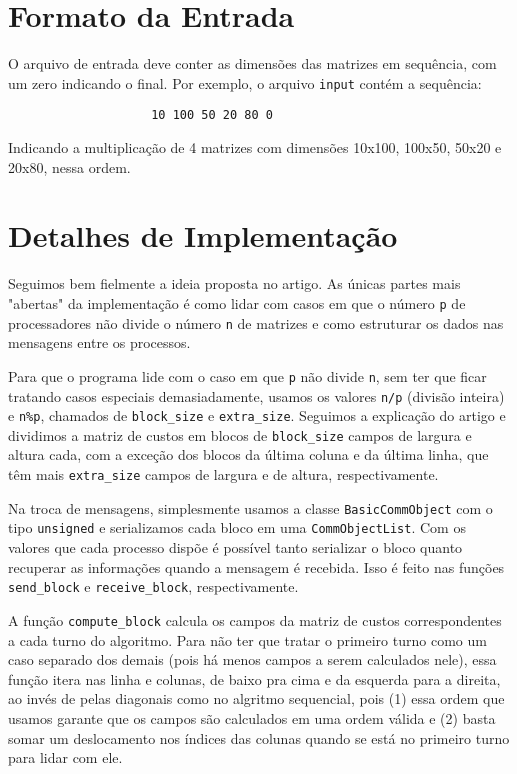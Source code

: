 \documentclass[a4paper,11pt]{article}
\begin{document}
\section{Formato da Entrada}

  O arquivo de entrada deve conter as dimensões das matrizes em sequência, com
  um zero indicando o final. Por exemplo, o arquivo \verb$input$ contém a
  sequência:

  \begin{verbatim}                    10 100 50 20 80 0 \end{verbatim}

  Indicando a multiplicação de 4 matrizes com dimensões 10x100, 100x50, 50x20 e
  20x80, nessa ordem.

\section{Detalhes de Implementação}

  Seguimos bem fielmente a ideia proposta no artigo\footnotemark. As únicas
  partes mais "abertas" da implementação é como lidar com casos em que o
  número \verb$p$ de processadores não divide o número \verb$n$ de matrizes e
  como estruturar os dados nas mensagens entre os processos.


  Para que o programa lide com o caso em que \verb$p$ não divide \verb$n$, sem
  ter que ficar tratando casos especiais demasiadamente, usamos os valores
  \verb$n/p$ (divisão inteira) e \verb$n%p$, chamados de \verb$block_size$ e
  \verb$extra_size$. Seguimos a explicação do artigo e dividimos a matriz de
  custos em blocos de \verb$block_size$ campos de largura e altura cada, com a
  exceção dos blocos da última coluna e da última linha, que têm mais
  \verb$extra_size$ campos de largura e de altura, respectivamente.

  Na troca de mensagens, simplesmente usamos a classe \verb$BasicCommObject$
  com o tipo \verb$unsigned$ e serializamos cada bloco em uma
  \verb$CommObjectList$. Com os valores que cada processo dispõe é possível
  tanto serializar o bloco quanto recuperar as informações quando a mensagem
  é recebida. Isso é feito nas funções \verb$send_block$ e \verb$receive_block$,
  respectivamente.

  A função \verb$compute_block$ calcula os campos da matriz de custos
  correspondentes a cada turno do algoritmo. Para não ter que tratar o primeiro
  turno como um caso separado dos demais (pois há menos campos a serem
  calculados nele), essa função itera nas linha e colunas, de baixo pra cima e
  da esquerda para a direita, ao invés de pelas diagonais como no algritmo
  sequencial, pois (1) essa ordem que usamos garante que os campos são
  calculados em uma ordem válida e (2) basta somar um deslocamento nos índices
  das colunas quando se está no primeiro turno para lidar com ele.
  
\end{document}
